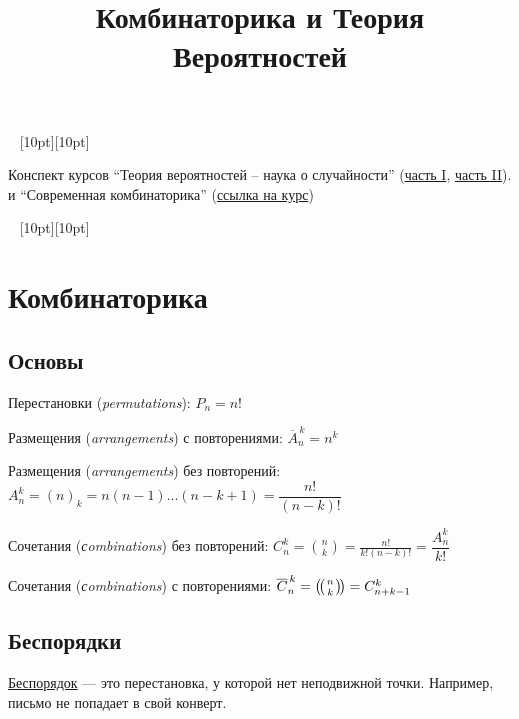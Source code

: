 \documentclass[a4paper,12pt,fleqn]{article}
\title{Комбинаторика и Теория Вероятностей}
\author{}
\date{}
\newenvironment{onsamepage} {\begin{minipage}{\textwidth}} {\end{minipage}}
\numberwithin{figure}{section}
\theoremstyle{definition}
\newcommand{\mbinom}[2] { \left( \! \middle( \genfrac{}{}{0pt}{}{#1}{#2} \middle) \! \right) }
\def\vignette{\vspace{48pt} \noindent \hrulefill~
	          \raisebox{-8pt}[10pt][10pt]{\Huge\ding{102}}
	          ~\hrulefill}
\begin{document}
\maketitle
\tableofcontents


\begin{onsamepage}
\vignette

Конспект курсов ``Теория вероятностей -- наука о случайности''
(\href{https://stepik.org/course/2911}{часть I},
 \href{https://stepik.org/course/3209}{часть II}).
и ``Современная комбинаторика''
(\href{https://www.coursera.org/learn/modern-combinatorics/home/welcome}{ссылка на курс})
\end{onsamepage}


\vignette
\section{Комбинаторика}

\subsection{Основы}

Перестановки (\textit{permutations}): $P_n = n!$

Размещения (\textit{arrangements}) с повторениями:
$\overline{A}_n^{\,k} = n^k$

Размещения (\textit{arrangements}) без повторений:
$A_n^k = (n)_k = n(n-1)...(n-k+1) = \dfrac{n!}{(n-k)!}$

Сочетания (\textit{сombinations}) без повторений:
$C_n^k = \binom{n}{k} = \frac{n!}{k!(n-k)!} = \dfrac{A_n^k}{k!}$

Сочетания (\textit{сombinations}) с повторениями:
$\overline{C}_n^{\,k} = \mbinom{n}{k} = C_{n+k-1}^k$


\subsection{Беспорядки}

\href{https://ru.wikipedia.org/wiki/%D0%91%D0%B5%D1%81%D0%BF%D0%BE%D1%80%D1%8F%D0%B4%D0%BE%D0%BA_(%D0%BF%D0%B5%D1%80%D0%B5%D1%81%D1%82%D0%B0%D0%BD%D0%BE%D0%B2%D0%BA%D0%B0)}{Беспорядок} --- это
перестановка, у которой нет неподвижной точки. Например, письмо не попадает в свой конверт.
\end{document}
